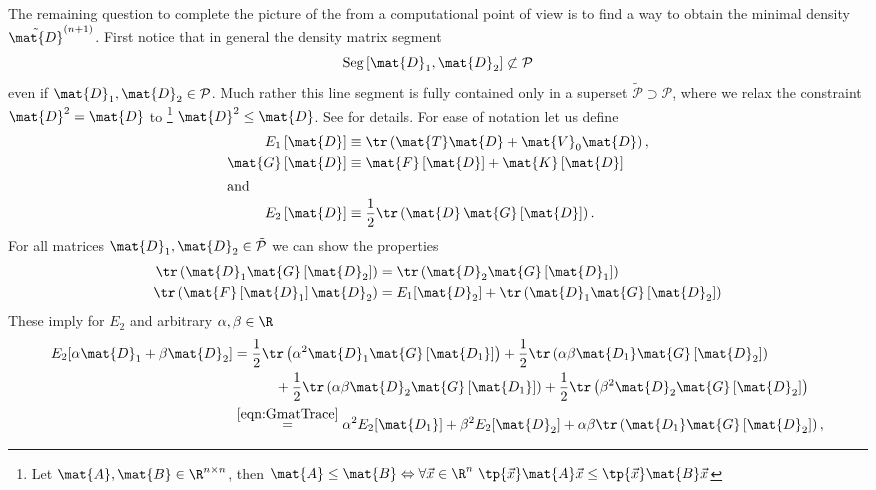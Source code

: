 The remaining question to complete the picture of the \ODA
from a computational point of view
is to find a way to obtain the minimal density $\tilde{\mat{D}}^{(n+1)}$.
First notice that in general the density matrix segment
\[\text{Seg}\left[\mat{D}_1, \mat{D}_2\right] \not\subset \mathcal{P}\]
even if $\mat{D}_1, \mat{D}_2 \in \mathcal{P}$.
Much rather this line segment is fully contained only in a superset
$\tilde{\mathcal{P}} \supset \mathcal{P}$,
where we relax the constraint $\mat{D}^2 = \mat{D}$ to%
\footnote{Let $\mat{A}, \mat{B} \in \R^{n\times n}$,
then $\mat{A} \leq \mat{B}
\Leftrightarrow \forall \vec{x} \in \R^n \
\tp{\vec{x}}\mat{A} \vec{x} \leq \tp{\vec{x}}\mat{B}\vec{x}$}
$\mat{D}^2 \leq \mat{D}$.
See \cite{Cances2000} for details.
For ease of notation let us define
%
\newcommand{\Gfct}[1]{  \mat{G}\left[ #1 \right]   }
\newcommand{\Pet}[1]{\textcolor{dkred}{\tilde{\mat{D}}^{(#1)}}}
\newcommand{\Pe}[1]{\textcolor{dkblue}{\mat{D}^{(#1)}}}
\newcommand{\Fot}[1]{\textcolor{dkred}{\tilde{\mat{F}}^{(#1)}}}
\newcommand{\Fo}[1]{\textcolor{dkblue}{\mat{F}^{(#1)}}}
\newcommand{\la}[1]{\lambda^{(#1)}}
\newcommand{\ila}[1]{\left( 1 - \la{#1} \right)}
\newcommand{\EHFD}[1]{\mathcal{E}_D^\text{HF}\left[#1\right]}
%
\newcommand{\Pn}{\Pet{n}}
\newcommand{\Pnn}{\Pe{n+1}}
\begin{align*}
	E_1 \left[\mat{D}\right] &\equiv \tr\left( \mat{T} \mat{D} + \mat{V}_0 \mat{D} \right), \\
	\mat{G}\left[ \mat{D} \right] &\equiv
		\mat{F}\left[ \mat{D} \right] + \mat{K}\left[ \mat{D} \right] \\
\intertext{and}
	E_2 \left[\mat{D}\right] &\equiv
		\frac12 \tr\left( \mat{D} \, \mat{G}\left[ \mat{D} \right] \right).
\end{align*}
For all matrices $\mat{D}_1, \mat{D}_2 \in \tilde{\mathcal{P}}$
we can show the properties~\cite{Cances2000a}
\begin{align}
	\label{eqn:TermGsymmetry}
	\tr \left( \mat{D}_1 \mat{G}\left[ \mat{D}_2 \right] \right)
		&= \tr \left( \mat{D}_2 \mat{G}\left[ \mat{D}_1 \right] \right) \\
	\label{eqn:GmatTrace}
	\tr\left( \mat{F}\left[ \mat{D}_1 \right] \mat{D}_2 \right)
	&= E_1[\mat{D}_2] + \tr\left( \mat{D}_1 \Gfct{\mat{D}_2} \right)
\end{align}
These imply for $E_2$ and arbitrary $\alpha, \beta \in \R$
\begin{equation}
	\begin{aligned}
	E_2[\alpha \mat{D}_1 + \beta\mat{D}_2]
	&= \frac 1 2 \tr\left( \alpha^2  \mat{D}_1 \Gfct{\mat{D_1}} \right)
		+ \frac 1 2 \tr\left( \alpha\beta \mat{D_1} \Gfct{\mat{D}_2} \right) \\
		\nonumber
		&\hspace{30pt}
		+ \frac 1 2 \tr\left( \alpha\beta \mat{D}_2 \Gfct{\mat{D_1}} \right)
		+ \frac 1 2 \tr\left( \beta^2 \mat{D}_2 \Gfct{\mat{D}_2} \right) \\
	 &\stackrel{\eqref{eqn:GmatTrace}}{=}
	 \alpha^2 E_2[\mat{D_1}] + \beta^2 E_2[\mat{D}_2]
	 + \alpha\beta \tr\left( \mat{D_1} \Gfct{\mat{D}_2} \right),
	\end{aligned}
	\label{eqn:HFE2}
\end{equation}
